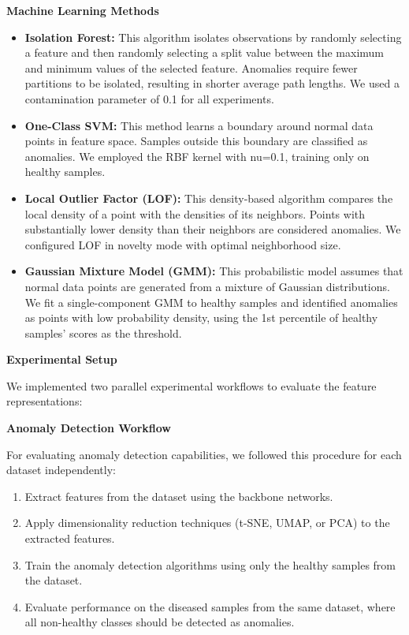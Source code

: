 \documentclass[12pt,a4paper,oneside]{report}
\begin{document}
\textbf{Machine Learning Methods}

\begin{itemize}
    \item \textbf{Isolation Forest:} This algorithm \cite{liu2008isolation} isolates observations by randomly selecting a feature and then randomly selecting a split value between the maximum and minimum values of the selected feature. Anomalies require fewer partitions to be isolated, resulting in shorter average path lengths. We used a contamination parameter of 0.1 for all experiments.
    
    \item \textbf{One-Class SVM:} This method \cite{scholkopf2001estimating} learns a boundary around normal data points in feature space. Samples outside this boundary are classified as anomalies. We employed the RBF kernel with nu=0.1, training only on healthy samples.
    
    \item \textbf{Local Outlier Factor (LOF):} This density-based algorithm \cite{breunig2000lof} compares the local density of a point with the densities of its neighbors. Points with substantially lower density than their neighbors are considered anomalies. We configured LOF in novelty mode with optimal neighborhood size.
    
    \item \textbf{Gaussian Mixture Model (GMM):} This probabilistic model assumes that normal data points are generated from a mixture of Gaussian distributions. We fit a single-component GMM to healthy samples and identified anomalies as points with low probability density, using the 1st percentile of healthy samples' scores as the threshold.
\end{itemize}

\textbf{Experimental Setup}

We implemented two parallel experimental workflows to evaluate the feature representations:

\textbf{Anomaly Detection Workflow}

For evaluating anomaly detection capabilities, we followed this procedure for each dataset independently:

\begin{enumerate}
    \item Extract features from the dataset using the backbone networks.
    \item Apply dimensionality reduction techniques (t-SNE, UMAP, or PCA) to the extracted features.
    \item Train the anomaly detection algorithms using only the healthy samples from the dataset.
    \item Evaluate performance on the diseased samples from the same dataset, where all non-healthy classes should be detected as anomalies.
\end{enumerate}
\end{document}
